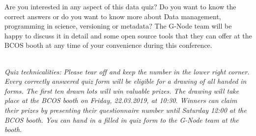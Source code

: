 \documentclass[8pt,BCOR10mm,oneside,headsepline]{scrartcl}
\begin{document}
\noindent Are you interested in any aspect of this data quiz? Do you want to know the correct answers or do you want to know more about Data management, programming in science, versioning or metadata? The G-Node team will be happy to discuss it in detail and some open source tools that they can offer at the BCOS booth at any time of your convenience during this conference.

~\\

\noindent \textit{Quiz technicalities: Please tear off and keep the number in the lower right corner. Every correctly answered quiz form will be eligible for a drawing of all handed in forms. The first ten drawn lots will win valuable prizes. The drawing will take place at the BCOS booth on Friday, 22.03.2019, at 10:30. Winners can claim their prizes by presenting their questionnaire number until Saturday 12:00 at the BCOS booth. You can hand in a filled in quiz form to the G-Node team at the booth.}
\end{document}

